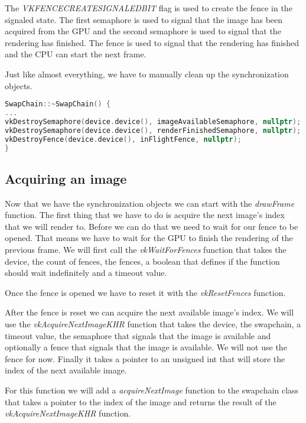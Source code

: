 \documentclass[12pt]{report} \usepackage{preamble}
\begin{document}
The \textit{VK\textunderscore FENCE\textunderscore CREATE\textunderscore SIGNALED\textunderscore BIT} flag is used to create the fence
in the signaled state. The first semaphore is used to signal that the image has been acquired from the \ac{GPU} and the second semaphore
is used to signal that the rendering has finished. The fence is used to signal that the rendering has finished and the CPU can
start the next frame.

Just like almost everything, we have to manually clean up the synchronization objects.

\begin{lstlisting}[language=C++]
SwapChain::~SwapChain() {
...
vkDestroySemaphore(device.device(), imageAvailableSemaphore, nullptr);
vkDestroySemaphore(device.device(), renderFinishedSemaphore, nullptr);
vkDestroyFence(device.device(), inFlightFence, nullptr);
}
\end{lstlisting}

\subsection{Acquiring an image}

Now that we have the synchronization objects we can start with the \textit{drawFrame} function. The first thing that we have to do
is acquire the next image's index that we will render to. Before we can do that we need to wait for our fence to be opened.
That means we have to wait for the GPU to finish the rendering of the previous frame.
We will first call the \textit{vkWaitForFences} function that takes the device, the count of fences,
the fences, a boolean that defines if the function should wait indefinitely and a timeout value.

Once the fence is opened we have to reset it with the \textit{vkResetFences} function.

After the fence is reset we can acquire the next available image's index. We will use the \textit{vkAcquireNextImageKHR} function that
takes the device, the swapchain, a timeout value, the semaphore that signals that the image is available and optionally a fence that
signals that the image is available. We will not use the fence for now. Finally it takes a pointer to an unsigned int that will store
the index of the next available image.

For this function we will add a \textit{acquireNextImage} function to the swapchain class that takes a pointer to the index of the image
and returns the result of the \textit{vkAcquireNextImageKHR} function.
\end{document}
